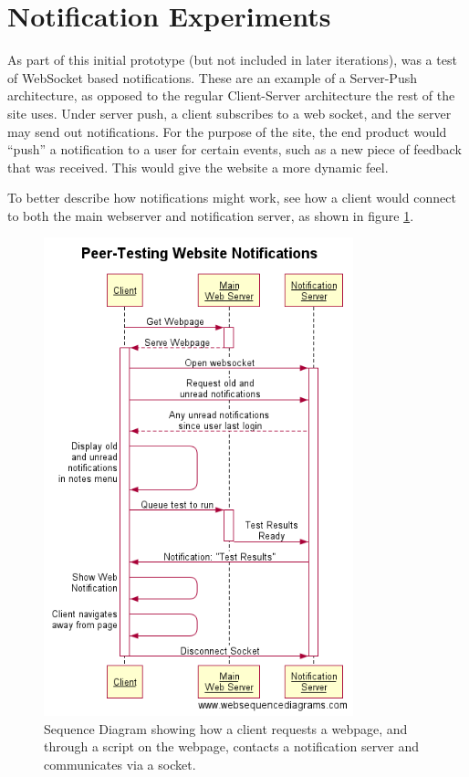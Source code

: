 \documentclass[a4paper,11pt]{report}
\begin{document}
\section{Notification Experiments}
\label{sec:notify-exp}
As part of this initial prototype (but not included in later iterations), was a test of WebSocket based notifications. These are an example of a Server-Push architecture, as opposed to the regular Client-Server architecture the rest of the site uses. Under server push, a client subscribes to a web socket, and the server may send out notifications. For the purpose of the site, the end product would ``push'' a notification to a user for certain events, such as a new piece of feedback that was received. This would give the website a more dynamic feel.\par
To better describe how notifications might work, see how a client would connect to both the main webserver and notification server, as shown in figure \ref{fig:seq-note}.
\begin{figure}[ht]
\includegraphics[width=0.8\textwidth]{fig/seq-note.png}
\caption{Sequence Diagram showing how a client requests a webpage, and through a script on the webpage, contacts a notification server and communicates via a socket.}
\label{fig:seq-note}
\end{figure}
\end{document}
